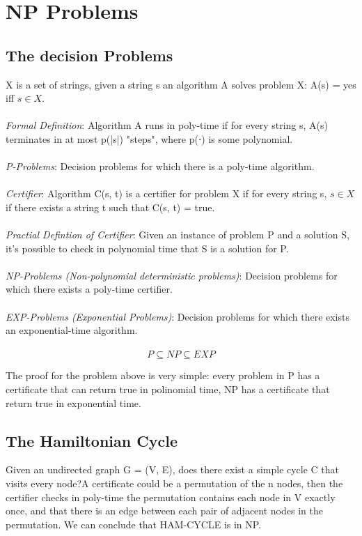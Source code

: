 \documentclass[11pt]{article}
\begin{document}
\clearpage

\section{NP Problems}

\subsection{The decision Problems}
X is a set of strings, given a string s an algorithm A solves problem X: A(s) = yes iff $s \in X$.\\\\
\emph{Formal Definition}: Algorithm A runs in poly-time if for every string s, A(s) terminates in at most p(|s|) "steps", where p(⋅) is some polynomial.\\\\
\emph{P-Problems}:  Decision problems for which there is a poly-time algorithm.\\\\
\emph{Certifier}: Algorithm C(s, t) is a certifier for problem X if for every string s, $s \in X$ if there exists a string t such that C(s, t) = true.\\\\
\emph{Practial Defintion of Certifier}: Given an instance of problem P and a solution S, it's possible to check in polynomial time that S is a solution for P.\\\\
\emph{NP-Problems (Non-polynomial deterministic problems)}: Decision problems for which there exists a poly-time certifier.\\\\
\emph{EXP-Problems (Exponential Problems)}: Decision problems for which there exists an exponential-time algorithm.\\\\

\[P \subseteq NP \subseteq EXP\]

The proof for the problem above is very simple: every problem in P has a certificate that can return true in polinomial time, NP has a certificate that return true in exponential time.

\subsection{The Hamiltonian Cycle}
Given an undirected graph G = (V, E), does there exist a simple cycle C that visits every node?A certificate could be a permutation of the n nodes, then the certifier checks in poly-time the permutation contains each node in V exactly once, and that there is an edge between each pair of adjacent nodes in the permutation. We can conclude that HAM-CYCLE is in NP.
\end{document}
